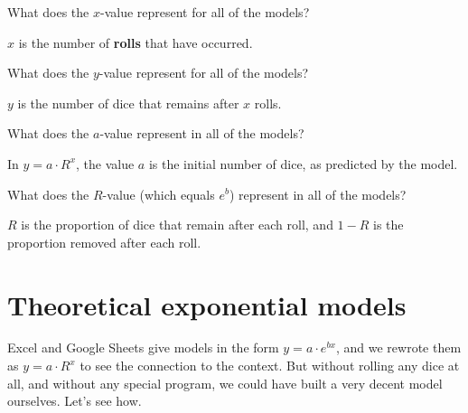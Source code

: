 \documentclass[12pt]{ximera}
\begin{document}
\begin{problem}
What does the $x$-value represent for all of the models?
\begin{freeResponse}
\end{freeResponse}
\begin{solution}
$x$ is the number of \textbf{rolls} that have occurred.
\end{solution}
\end{problem}

\begin{problem}
What does the $y$-value represent for all of the models?
\begin{freeResponse}
\end{freeResponse}
\begin{solution}
$y$ is the number of dice that remains after $x$ rolls.
\end{solution}
\end{problem}

\begin{problem}
What does the $a$-value represent in all of the models?
\begin{freeResponse}
\end{freeResponse}
\begin{solution}
In $y = a \cdot R^{x}$, the value $a$ is the initial number of dice, as predicted by
the model.
\end{solution}
\end{problem}

\begin{problem}
What does the $R$-value (which equals $e^{b}$) represent in all of the models?
\begin{freeResponse}
\end{freeResponse}
\begin{solution}
$R$ is the proportion of dice that remain after each roll, and $1 - R$ is the
proportion removed after each roll.
\end{solution}
\end{problem}

\section*{Theoretical exponential models}

Excel and Google Sheets give models in the form $y = a \cdot e^{bx}$, and we rewrote
them as $y = a \cdot R^{x}$ to see the connection to the context. But without rolling
any dice at all, and without any special program, we could have built a very decent
model ourselves. Let's see how.
\end{document}

